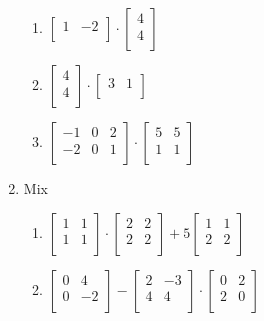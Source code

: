\documentclass[a4paper]{article}
\begin{document}
\begin{multicols}{2}
\begin{enumerate}
\begin{enumerate}
\item 
$
\begin{bmatrix}
1 & -2\\
\end{bmatrix}
\cdot
\begin{bmatrix}
  4\\
  4\\
\end{bmatrix}
$

\item 
$
\begin{bmatrix}
4\\
4\\
\end{bmatrix}
\cdot
\begin{bmatrix}
  3 & 1\\
\end{bmatrix}
$

\item 
$
\begin{bmatrix}
-1 & 0 & 2\\
-2 & 0 & 1\\
\end{bmatrix}
\cdot
\begin{bmatrix}
  5 & 5\\
  1 & 1\\
\end{bmatrix}
$
\end{enumerate}

\item Mix

  \begin{enumerate}
  \item 
$
\begin{bmatrix}
1 & 1\\
1 & 1\\
\end{bmatrix}
\cdot
\begin{bmatrix}
  2 & 2\\
  2 & 2\\
\end{bmatrix}
+5
\begin{bmatrix}
  1 & 1\\
  2 & 2\\
\end{bmatrix}
$

  \item 
$
\begin{bmatrix}
 0 & 4\\
 0 & -2\\
\end{bmatrix}
-
\begin{bmatrix}
  2 & -3\\
  4 & 4\\
\end{bmatrix}
\cdot
\begin{bmatrix}
  0 & 2\\
  2 & 0\\
\end{bmatrix}
$


\end{enumerate}
\end{enumerate}
\end{multicols}
\end{document}
